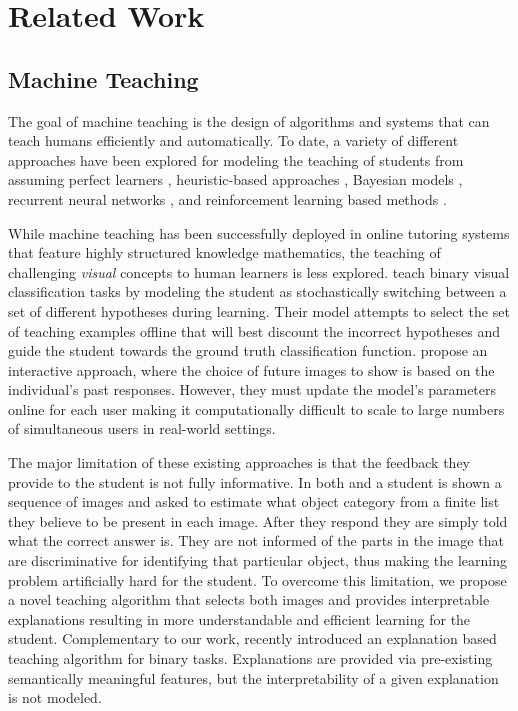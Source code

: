 \documentclass[../main.tex]{subfiles}
\begin{document}
\section{Related Work}
\label{rel_work}

\subsection*{Machine Teaching}
The goal of machine teaching is the design of algorithms and systems that can teach humans efficiently and automatically. 
To date, a variety of different approaches have been explored for modeling the teaching of students from assuming perfect learners \cite{goldman1995complexity, zhu2013machine, liu2017iterative}, heuristic-based approaches \cite{basu2013teaching}, Bayesian models \cite{corbett1994knowledge,eaves2015tractable}, recurrent neural networks \cite{piech2015deep}, and reinforcement learning based methods \cite{rafferty2011faster,bak2016adaptive,whitehill2017approximately}.

While machine teaching has been successfully deployed in online tutoring systems that feature highly structured knowledge \eg mathematics, the teaching of challenging \emph{visual} concepts to human learners is less explored. 
\cite{singla2014near} teach binary visual classification tasks by modeling the student as stochastically switching between a set of different hypotheses during learning. 
Their model attempts to select the set of teaching examples offline that will best discount the incorrect hypotheses and guide the student towards the ground truth classification function.  
\cite{johns2015} propose an interactive approach, where the choice of future images to show is based on the individual’s past responses. 
However, they must update the model's parameters online for each user making it computationally difficult to scale to large numbers of simultaneous users in real-world settings.

The major limitation of these existing approaches is that the feedback they provide to the student is not fully informative. 
In both \cite{singla2014near} and \cite{johns2015} a student is shown a sequence of images and asked to estimate what object category from a finite list they believe to be present in each image. 
After they respond they are simply told what the correct answer is. 
They are not informed of the parts in the image that are discriminative for identifying that particular object, thus making the learning problem artificially hard for the student. 
To overcome this limitation, we propose a novel teaching algorithm that selects both images and provides interpretable explanations resulting in more understandable and efficient learning for the student. 
Complementary to our work, \cite{chenAiStats2018} recently introduced an explanation based teaching algorithm for binary tasks. Explanations are provided via pre-existing semantically meaningful features, but the interpretability of a given explanation is not modeled.  
\end{document}
